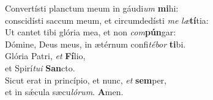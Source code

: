 \evenverse Convertísti planctum meum in gáudi\textit{um} \textbf{mi}hi:~\*\\
\evenverse conscidísti saccum meum, et circumdedísti \textit{me} \textit{læ}\textbf{tí}tia:\\
\oddverse Ut cantet tibi glória mea, et non \textit{com}\textbf{pún}gar:~\*\\
\oddverse Dómine, Deus meus, in ætérnum confi\textit{té}\textit{bor} \textbf{ti}bi.\\
\evenverse Glória Patri, \textit{et} \textbf{Fí}lio,~\*\\
\evenverse et Spirí\textit{tu}\textit{i} \textbf{San}cto.\\
\oddverse Sicut erat in princípio, et nunc, \textit{et} \textbf{sem}per,~\*\\
\oddverse et in sǽcula sæcu\textit{ló}\textit{rum}. \textbf{A}men.\\

